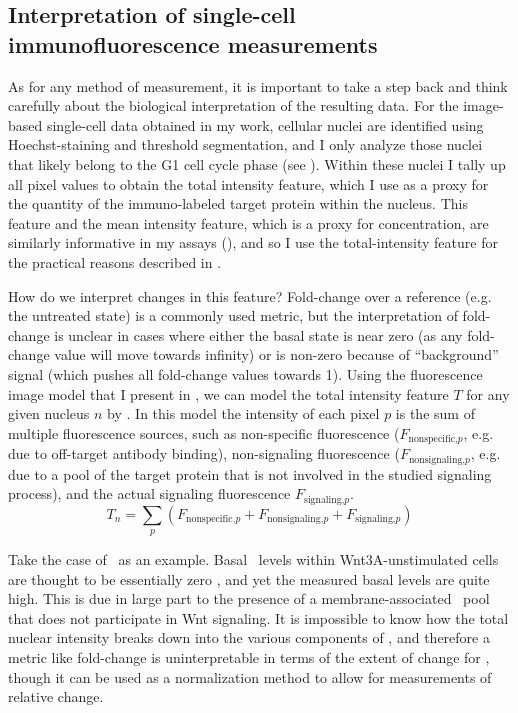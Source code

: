  

  
  
\subsection{Interpretation of single-cell immunofluorescence measurements}


As for any method of measurement, it is important to
take a step back and think carefully about the biological
interpretation of the resulting data. For the image-based
single-cell data obtained in my work, cellular nuclei are
identified using Hoechst-staining and threshold segmentation,
and I only analyze those nuclei that likely belong to the G1 cell
cycle phase (see ).
Within these nuclei I tally up all pixel values to obtain
the total intensity feature, which I use as a proxy for
the quantity of the immuno-labeled target protein within the nucleus.
This feature and the mean intensity feature,
which is a proxy for concentration, are similarly informative
in my assays (), and
so I use the total-intensity feature for the practical
reasons described in .
  

How do we interpret changes in this feature? Fold-change
over a reference (e.g. the untreated state) is a commonly used
metric, but the interpretation of fold-change is unclear in cases where
either the basal state is near zero (as any fold-change
value will move towards infinity) or is non-zero because of ``background'' signal
(which pushes all fold-change values towards 1). Using the
fluorescence image model that I present in 
, we can model the total intensity feature $T$
for any given nucleus $n$ by . In this model the intensity of
each pixel $p$ is the sum of multiple fluorescence sources, such as
non-specific fluorescence ($F_{\text{nonspecific,}p}$,
e.g. due to off-target antibody
binding), non-signaling fluorescence ($F_{\text{nonsignaling,}p}$, 
e.g. due to a pool of the target
protein that is not involved in the studied signaling process), and the
actual signaling fluorescence $F_{\text{signaling,}p}$.
    \begin{equation} \label{eq:system:total}
    T_n=\sum_p\left(F_{\text{nonspecific,}p}+F_{\text{nonsignaling,}p}+F_{\text{signaling,}p}\right)
    \end{equation}


Take the case of \bcat\ as an example. Basal
\bcat\ levels within Wnt3A-unstimulated cells are thought to be
essentially zero , and yet the measured basal levels are
quite high. This is due in large part to the presence of a
membrane-associated \bcat\ pool that does not participate in
Wnt signaling. It is impossible to know how the total nuclear
intensity breaks down into the various components of
, and therefore
a metric like fold-change is uninterpretable in terms of the extent
of change for \bcat, though it can be used as a normalization method
to allow for measurements of relative change.


